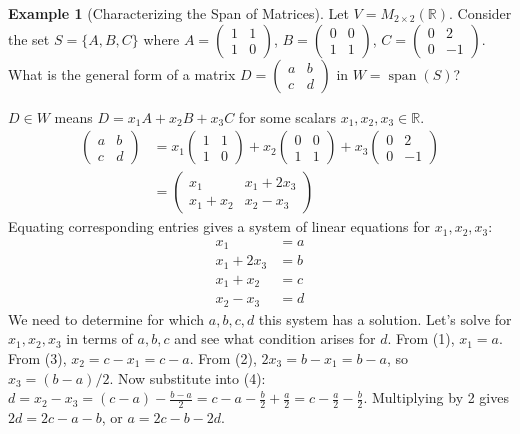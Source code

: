 \documentclass[11pt]{article}
\theoremstyle{definition}
\newtheorem{example}[theorem]{Example}
\theoremstyle{remark}
\newcommand{\R}{\mathbb{R}}
\newcommand{\Mat}[3]{M_{#1 \times #2}(#3)}
\DeclareMathOperator{\Span}{span}
\begin{document}
\begin{example}[Characterizing the Span of Matrices]
Let $V = \Mat{2}{2}{\R}$. Consider the set $S = \{A, B, C\}$ where
$A = \begin{pmatrix} 1 & 1 \\ 1 & 0 \end{pmatrix}$, $B = \begin{pmatrix} 0 & 0 \\ 1 & 1 \end{pmatrix}$, $C = \begin{pmatrix} 0 & 2 \\ 0 & -1 \end{pmatrix}$.
What is the general form of a matrix $D = \begin{pmatrix} a & b \\ c & d \end{pmatrix}$ in $W = \Span(S)$?

$D \in W$ means $D = x_1 A + x_2 B + x_3 C$ for some scalars $x_1, x_2, x_3 \in \R$.
\begin{align*} \begin{pmatrix} a & b \\ c & d \end{pmatrix} &= x_1 \begin{pmatrix} 1 & 1 \\ 1 & 0 \end{pmatrix} + x_2 \begin{pmatrix} 0 & 0 \\ 1 & 1 \end{pmatrix} + x_3 \begin{pmatrix} 0 & 2 \\ 0 & -1 \end{pmatrix} \\ &= \begin{pmatrix} x_1 & x_1 + 2x_3 \\ x_1 + x_2 & x_2 - x_3 \end{pmatrix} \end{align*}
Equating corresponding entries gives a system of linear equations for $x_1, x_2, x_3$:
\begin{align*} x_1 &= a \\ x_1 + 2x_3 &= b \\ x_1 + x_2 &= c \\ x_2 - x_3 &= d \end{align*}
We need to determine for which $a, b, c, d$ this system has a solution. Let's solve for $x_1, x_2, x_3$ in terms of $a, b, c$ and see what condition arises for $d$.
From (1), $x_1 = a$.
From (3), $x_2 = c - x_1 = c - a$.
From (2), $2x_3 = b - x_1 = b - a$, so $x_3 = (b - a) / 2$.
Now substitute into (4):
$d = x_2 - x_3 = (c - a) - \frac{b - a}{2} = c - a - \frac{b}{2} + \frac{a}{2} = c - \frac{a}{2} - \frac{b}{2}$.
Multiplying by 2 gives $2d = 2c - a - b$, or $a = 2c - b - 2d$.


\end{example}
\end{document}
